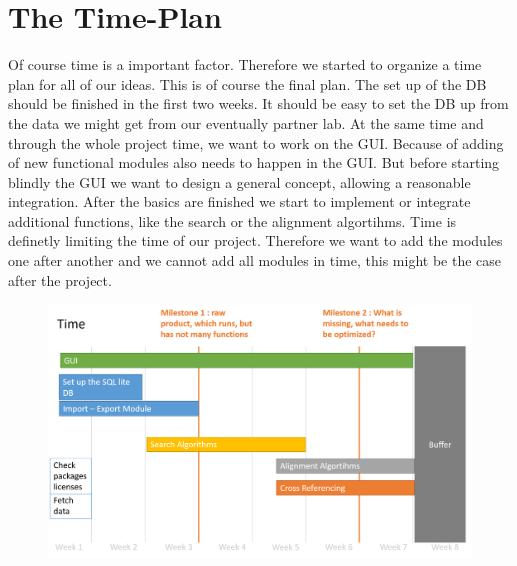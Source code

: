 \documentclass[]{article}
\begin{document}
\section{ The Time-Plan}
Of course time is a important factor. Therefore we started to organize a time plan for all of our ideas. This is of course the final plan. The set up of the DB should be finished in the first two weeks. It should be easy to set the DB up from the data we might get from our eventually partner lab. At the same time and through the whole project time, we want to work on the GUI. Because of adding of new functional modules also needs to happen in the GUI. But before starting blindly the GUI we want to design a general concept, allowing a reasonable integration. After the basics are finished we start to implement or integrate additional functions, like the search or the alignment algortihms. Time is definetly limiting the time of our project. Therefore we want to add the modules one after another and we cannot add all modules in time, this might be the case after the project.
  
	\begin{figure}[h]
		\includegraphics[width=\textwidth]{img/Time.png}
	\end{figure}
\end{document}
